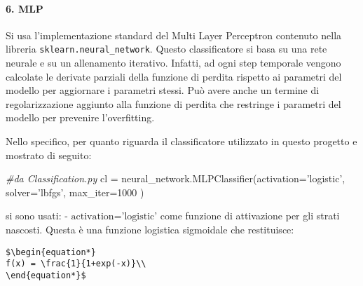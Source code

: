\documentclass[11pt]{article}
\newenvironment{Shaded}{}{}
\newcommand{\DecValTok}[1]{\textcolor[rgb]{0.25,0.63,0.44}{{#1}}}
\newcommand{\StringTok}[1]{\textcolor[rgb]{0.25,0.44,0.63}{{#1}}}
\newcommand{\CommentTok}[1]{\textcolor[rgb]{0.38,0.63,0.69}{\textit{{#1}}}}
\newcommand{\NormalTok}[1]{{#1}}
\newcommand{\OperatorTok}[1]{\textcolor[rgb]{0.40,0.40,0.40}{{#1}}}
\begin{document}
    \paragraph{6. MLP}\label{mlp}

    Si usa l'implementazione standard del Multi Layer Perceptron contenuto
nella libreria \texttt{sklearn.neural\_network}. Questo classificatore
si basa su una rete neurale e su un allenamento iterativo. Infatti, ad
ogni step temporale vengono calcolate le derivate parziali della
funzione di perdita rispetto ai parametri del modello per aggiornare i
parametri stessi. Può avere anche un termine di regolarizzazione
aggiunto alla funzione di perdita che restringe i parametri del modello
per prevenire l'overfitting.

Nello specifico, per quanto riguarda il classificatore utilizzato in
questo progetto e mostrato di seguito:

\begin{Shaded}
\begin{Highlighting}[]
\CommentTok{#da Classification.py}
\NormalTok{cl }\OperatorTok{=}\NormalTok{ neural_network.MLPClassifier(activation}\OperatorTok{=}\StringTok{'logistic'}\NormalTok{, solver}\OperatorTok{=}\StringTok{'lbfgs'}\NormalTok{, max_iter}\OperatorTok{=}\DecValTok{1000}\NormalTok{ )       }
\end{Highlighting}
\end{Shaded}

si sono usati: - \(\text{activation='logistic'}\) come funzione di
attivazione per gli strati nascosti. Questa è una funzione logistica
sigmoidale che restituisce:

\begin{verbatim}
$\begin{equation*}
f(x) = \frac{1}{1+exp(-x)}\\
\end{equation*}$
\end{verbatim}
\end{document}
